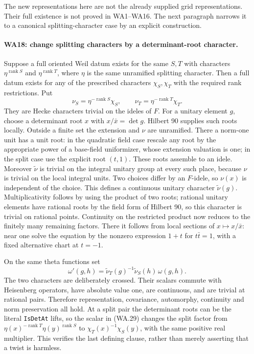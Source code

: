 The new representations here are not the already supplied grid
representations.  Their full existence is not proved in
WA1--WA16.  The next paragraph narrows it to a canonical
splitting-character case by an explicit construction.

\paragraph{WA18: change splitting characters by a determinant-root character.}
Suppose a full oriented Weil datum exists for the same $S,T$
with characters $\eta^{\operatorname{rank}S}$ and
$\eta^{\operatorname{rank}T}$, where $\eta$ is the same
unramified splitting character.  Then a full datum exists for
any of the prescribed characters $\chi_S,\chi_T$ with the
required rank restrictions.  Put
\[
 \nu_S=\eta^{-\operatorname{rank}S}\chi_S,\qquad
 \nu_T=\eta^{-\operatorname{rank}T}\chi_T.
                                                               \tag{WA.28}
\]
They are Hecke characters trivial on the ideles of $F$.
For a unitary element $g$, choose a determinant root $x$ with
$x/\bar x=\det g$.  Hilbert 90 supplies such roots locally.
Outside a finite set the extension and $\nu$ are unramified.
There a norm-one unit has a unit root: in the quadratic field
case rescale any root by the appropriate power of a base-field
uniformizer, whose extension valuation is one; in the split
case use the explicit root $(t,1)$.  These roots assemble to
an idele.  Moreover $\widetilde\nu$ is trivial on the integral
unitary group at every such place, because $\nu$ is trivial on
the local integral units.
Two choices differ by an $F$-idele, so $\nu(x)$ is independent
of the choice.  This defines a continuous unitary character
$\widetilde\nu(g)$.  Multiplicativity follows by using the
product of two roots; rational unitary elements have rational
roots by the field form of Hilbert 90, so this character is
trivial on rational points.  Continuity on the restricted product
now reduces to the finitely many remaining factors.  There it
follows from local
sections of $x\mapsto x/\bar x$: near one solve the equation
by the nonzero expression $1+t$ for $t\bar t=1$, with a
fixed alternative chart at $t=-1$.

On the same theta functions set
\[
 \omega'(g,h)=\widetilde\nu_T(g)^{-1}
                          \widetilde\nu_S(h)\,\omega(g,h).
                                                               \tag{WA.29}
\]
The two characters are deliberately crossed.  Their scalars
commute with Heisenberg operators, have absolute value one,
are continuous, and are trivial at rational pairs.  Therefore
representation, covariance, automorphy, continuity and norm
preservation all hold.  At a split pair the determinant roots
can be the literal \texttt{IsDetAt} lifts, so the scalar in
(WA.29) changes the split factor from
$\eta(x)^{-\operatorname{rank}T}\eta(y)^{\operatorname{rank}S}$
to $\chi_T(x)^{-1}\chi_S(y)$, with the same positive real
multiplier.  This verifies the last defining clause, rather than
merely asserting that a twist is harmless.

